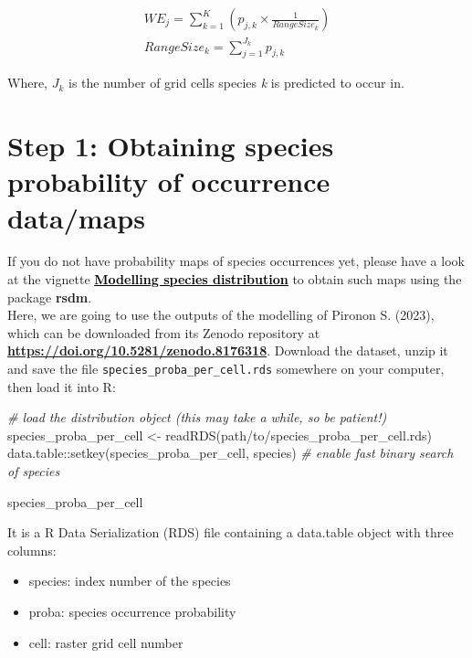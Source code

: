 \documentclass[
]{article}
\newenvironment{Shaded}{\begin{snugshade}}{\end{snugshade}}
\newcommand{\CommentTok}[1]{\textcolor[rgb]{0.56,0.35,0.01}{\textit{#1}}}
\newcommand{\FunctionTok}[1]{\textcolor[rgb]{0.00,0.00,0.00}{#1}}
\newcommand{\NormalTok}[1]{#1}
\newcommand{\OtherTok}[1]{\textcolor[rgb]{0.56,0.35,0.01}{#1}}
\newcommand{\SpecialCharTok}[1]{\textcolor[rgb]{0.00,0.00,0.00}{#1}}
\newcommand{\StringTok}[1]{\textcolor[rgb]{0.31,0.60,0.02}{#1}}
\providecommand{\tightlist}{%
  \setlength{\itemsep}{0pt}\setlength{\parskip}{0pt}}
\begin{document}
\begin{gather}
\tag{3}
WE_j = \sum_{k=1}^K(p_{j,k}\times\frac{1}{Range Size_k})
\\
\tag{4}
RangeSize_k = \sum_{j=1}^{J_k}p_{j,k}
\end{gather}

Where, \(J_k\) is the number of grid cells species \emph{k} is predicted
to occur in.

\hypertarget{step-1-obtaining-species-probability-of-occurrence-datamaps}{%
\section{Step 1: Obtaining species probability of occurrence
data/maps}\label{step-1-obtaining-species-probability-of-occurrence-datamaps}}

If you do not have probability maps of species occurrences yet, please
have a look at the vignette
\href{}{\textbf{\textcolor{black}{\underline{Modelling species distribution}}}}
to obtain such maps using the package \textbf{rsdm}.\\
Here, we are going to use the outputs of the modelling of Pironon S.
(2023), which can be downloaded from its Zenodo repository at
\href{https://doi.org/10.5281/zenodo.8176318}{\textbf{https://doi.org/10.5281/zenodo.8176318}}.
Download the dataset, unzip it and save the file
\texttt{species\_proba\_per\_cell.rds} somewhere on your computer, then
load it into R:

\begin{Shaded}
\begin{Highlighting}[]

\CommentTok{\# load the distribution object (this may take a while, so be patient!)}
\NormalTok{species\_proba\_per\_cell }\OtherTok{\textless{}{-}} \FunctionTok{readRDS}\NormalTok{(}\StringTok{\textquotesingle{}path/to/species\_proba\_per\_cell.rds\textquotesingle{}}\NormalTok{) }
\NormalTok{data.table}\SpecialCharTok{::}\FunctionTok{setkey}\NormalTok{(species\_proba\_per\_cell, species) }\CommentTok{\# enable fast binary search of species}

\NormalTok{species\_proba\_per\_cell}
\end{Highlighting}
\end{Shaded}

It is a R Data Serialization (RDS) file containing a data.table object
with three columns:

\begin{itemize}
\tightlist
\item
  species: index number of the species
\item
  proba: species occurrence probability
\item
  cell: raster grid cell number
\end{itemize}
\end{document}
